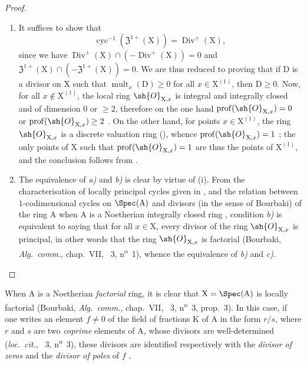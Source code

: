 \begin{proof}
\begin{enumerate}[label=(\roman*)]
  \item It suffices to show that
\[
\label{IV.21.6.9.1}
  \operatorname{cyc}^{-1}(\mathfrak{Z}^{1+}(\mathrm{X}))=\operatorname{Div}^+(\mathrm{X}),
  \tag{21.6.9.1}
\]
since we have $\operatorname{Div}^+(\mathrm{X})\cap(-\operatorname{Div}^+(\mathrm{X}))=0$ and $\mathfrak{Z}^{1+}(\mathrm{X})\cap(-\mathfrak{Z}^{1+}(\mathrm{X}))=0$.
We are thus reduced to proving that if $\mathrm{D}$ is a divisor on $\mathrm{X}$ such that $\operatorname{mult}_x(\mathrm{D})\geq 0$ for all $x\in\mathrm{X}^{(1)}$, then $\mathrm{D}\geq 0$.
Now, for all $x\notin\mathrm{X}^{(1)}$, the local ring $\sh{O}_{\mathrm{X},x}$ is integral and integrally closed and
of dimension $0$ or $\geq 2$, therefore on the one hand $\operatorname{prof}(\sh{O}_{\mathrm{X},x})=0$ or $\operatorname{prof}(\sh{O}_{\mathrm{X},x})\geq 2$ .
On the other hand, for points $x\in\mathrm{X}^{(1)}$, the ring $\sh{O}_{\mathrm{X},x}$ is a discrete valuation ring (),
whence $\operatorname{prof}(\sh{O}_{\mathrm{X},x})=1$ ;
the only points of $\mathrm{X}$ such that $\operatorname{prof}(\sh{O}_{\mathrm{X},x})=1$ are thus the points of $\mathrm{X}^{(1)}$, and the conclusion follows from .

  \item The equivalence of \emph{a)} and \emph{b)} is clear by virtue of (i).
From the characterisation of locally principal cycles given in , and the relation between $1$-codimensional cycles on $\Spec(\mathrm{A})$ and divisors (in the sense of Bourbaki) of the ring $\mathrm{A}$ when $\mathrm{A}$ is a Noetherian integrally closed ring , condition \emph{b)} is equivalent to saying that for all $x\in\mathrm{X}$, every divisor of the ring $\sh{O}_{\mathrm{X},x}$ is principal, in other words that the ring $\sh{O}_{\mathrm{X},x}$ is factorial (Bourbaki, \emph{Alg.\ comm.}, chap.~VII, \textsection~3, n\textsuperscript{o}~1), whence the equivalence of \emph{b)} and \emph{c)}.
\end{enumerate}
\end{proof}

\begin{env}[21.6.9.2]
\label{IV.21.6.9.2}
When $\mathrm{A}$ is a Noetherian \emph{factorial} ring, it is clear that $\mathrm{X}=\Spec(\mathrm{A})$ is locally factorial (Bourbaki, \emph{Alg.\ comm.}, chap.~VII, \textsection~3, n\textsuperscript{o}~3, prop.~3).
In this case, if one writes an element $f\neq 0$ of the field of fractions $\mathrm{K}$ of $\mathrm{A}$ in the form $r/s$, where $r$ and $s$ are two \emph{coprime} elements of $\mathrm{A}$, whose divisors are well-determined (\emph{loc.\ cit.}, \textsection~3, n\textsuperscript{o}~3), these divisors are identified respectively with the \emph{divisor of zeros} and the \emph{divisor of poles} of $f$ .
\end{env}

